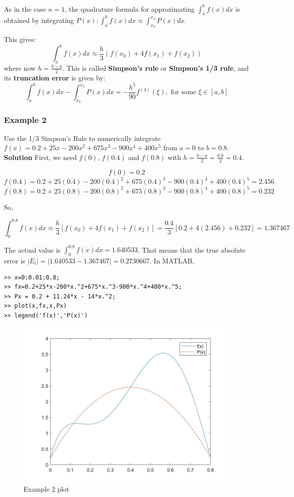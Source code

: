\documentclass [titlepage,12pt,letter] {article}
\begin{document}
\noindent 
As in the case $n=1$, the quadrature formula for approximating $\int_a^{b} f(x)dx$ is obtained by integrating $P(x): \int_{a}^{b}f(x)dx \approx \int_{x_0}^{x_2}P(x)dx$. 

This gives: 
\[
   \int_{a}^{b} f(x)dx \approx \frac{h}{3}(f(x_0) + 4 f(x_1) + f(x_2))
\]
\noindent 
where now $h=\frac{b-a}{2}$. This is called {\bf Simpson's rule} or {\bf Simpson's 1/3 rule}, and its {\bf truncation error} is given by: 
\[
\int_{a}^{b}f(x)dx - \int_{x_0}^{x_2} P(x)dx = -\frac{h^5}{90} f^{(4)}(\xi), \mbox { for some } \xi \in [a,b] 
\]


\subsubsection{Example 2} 

Use the 1/3 Simpson's Rule to numerically integrate $f(x)=0.2+25x-200x^2+675x^3-900x^4+400x^5$ from $a=0$ to $b=0.8$. \\

{\bf Solution}
First, we need $f(0)$, $f(0.4)$ and $f(0.8)$ with $h=\frac{b-a}{2}=\frac{0.8}{2}=0.4$.

\[
f(0)=0.2
\]
\[
f(0.4)=0.2+25(0.4)-200(0.4)^2+675(0.4)^3-900(0.4)^4+400(0.4)^5 = 2.456
\]
\[
f(0.8)=0.2+25(0.8)-200(0.8)^2+675(0.8)^3-900(0.8)^4+400(0.8)^5 = 0.232
\]

So,

\[
\int_0^{0.8}f(x)dx \approx \frac{h}{3}[f(x_0)+4f(x_1)+f(x_2)] = \frac{0.4}{3}[0.2+4(2.456)+0.232] = 1.367467
\]

The actual value is $\int_0^{0.8}f(x)dx=1.640533$. That means that the true absolute error is $|E_t|=|1.640533-1.367467|=0.2730667$. In MATLAB,

\begin{verbatim}
>> x=0:0.01:0.8;
>> fx=0.2+25*x-200*x.^2+675*x.^3-900*x.^4+400*x.^5;
>> Px = 0.2 + 11.24*x - 14*x.^2;
>> plot(x,fx,x,Px)
>> legend('f(x)','P(x)')
\end{verbatim}

\begin{figure} 
  \centering
  \includegraphics[scale=0.3]{lect15_ex2}
  \caption{Example 2 plot}
  \label{fig:lect15_ex2}
\end{figure}
\end{document}
